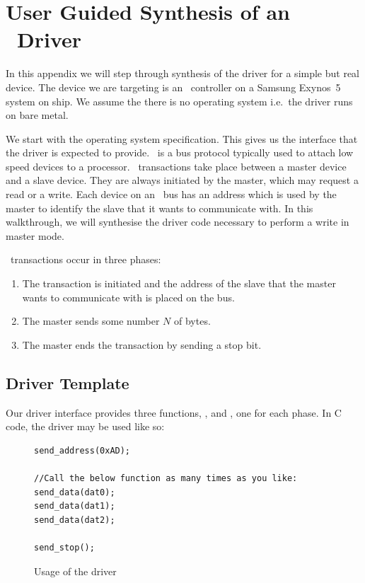 \chapter{User Guided Synthesis of an \iic\ Driver}
\label{ch:worked_example}

In this appendix we will step through synthesis of the driver for a simple but real device. The device we are targeting is an \iic\ controller on a Samsung Exynos~5 system on ship. We assume the there is no operating system i.e.\ the driver runs on bare metal.

We start with the operating system specification. This gives us the interface that the driver is expected to provide. \iic\ is a bus protocol typically used to attach low speed devices to a processor. \iic\ transactions take place between a master device and a slave device. They are always initiated by the master, which may request a read or a write. Each device on an \iic\ bus has an address which is used by the master to identify the slave that it wants to communicate with. In this walkthrough, we will synthesise the driver code necessary to perform a write in master mode. 

\iic\ transactions occur in three phases:
\begin{enumerate}
    \item The transaction is initiated and the address of the slave that the master wants to communicate with is placed on the bus.
    \item The master sends some number $N$ of bytes.
    \item The master ends the transaction by sending a stop bit.
\end{enumerate}

\section{Driver Template}

Our driver interface provides three functions, ,  and , one for each phase. In C code, the driver may be used like so:
\begin{figure}
\caption{Usage of the \iic driver}
\label{fig:iic_usage}
\begin{lstlisting}[frame=single]
send_address(0xAD);

//Call the below function as many times as you like:
send_data(dat0);
send_data(dat1);
send_data(dat2);

send_stop();
\end{lstlisting}
\end{figure}

